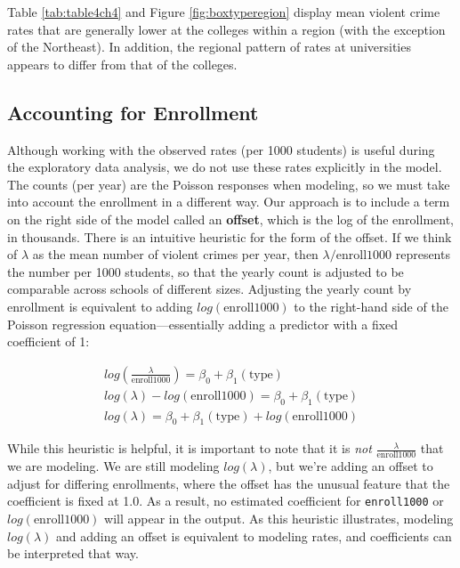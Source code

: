 \documentclass[
]{krantz}
\begin{document}
Table \ref{tab:table4ch4} and Figure \ref{fig:boxtyperegion} display mean violent crime rates that are generally lower at the colleges within a region (with the exception of the Northeast). In addition, the regional pattern of rates at universities appears to differ from that of the colleges.

\hypertarget{accounting-for-enrollment}{%
\subsection{Accounting for Enrollment}\label{accounting-for-enrollment}}

Although working with the observed rates (per 1000 students) is useful during the exploratory data analysis, we do not use these rates explicitly in the model. The counts (per year) are the Poisson responses when modeling, so we must take into account the enrollment in a different way. Our approach is to include a term on the right side of the model called an \textbf{offset},  which is the log of the enrollment, in thousands. There is an intuitive heuristic for the form of the offset. If we think of \(\lambda\) as the mean number of violent crimes per year, then \(\lambda/\textrm{enroll1000}\) represents the number per 1000 students, so that the yearly count is adjusted to be comparable across schools of different sizes. Adjusting the yearly count by enrollment is equivalent to adding \(log(\textrm{enroll1000})\) to the right-hand side of the Poisson regression equation---essentially adding a predictor with a fixed coefficient of 1:

\begin{align*} 
log(\frac{\lambda}{\textrm{enroll1000}} )= \beta_0 + \beta_1(\textrm{type}) \nonumber \\
log(\lambda)-log(\textrm{enroll1000}) = \beta_0 + \beta_1(\textrm{type}) \nonumber \\
log(\lambda) = \beta_0 + \beta_1(\textrm{type}) + log(\textrm{enroll1000})
\end{align*}

While this heuristic is helpful, it is important to note that it is \emph{not} \(\frac{\lambda}{ \textrm{enroll1000}}\) that we are modeling. We are still modeling \(log(\lambda)\), but we're adding an offset to adjust for differing enrollments, where the offset has the unusual feature that the coefficient is fixed at 1.0. As a result, no estimated coefficient for \texttt{enroll1000} or \(log(\textrm{enroll1000})\) will appear in the output. As this heuristic illustrates, modeling \(log(\lambda)\) and adding an offset is equivalent to modeling rates, and coefficients can be interpreted that way.
\end{document}
